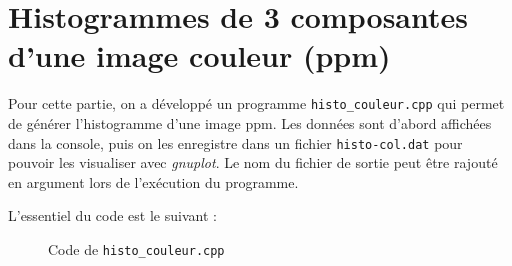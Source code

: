 \documentclass[french,a4paper,10pt]{article}
\begin{document}
	\newpage
	\section{Histogrammes de 3 composantes d'une image couleur (ppm)}\label{sec:6}


	Pour cette partie, on a d\'evelopp\'e un programme \texttt{histo\_couleur.cpp} qui permet de g\'en\'erer
	l'histogramme d'une image ppm.
	Les données sont d'abord affichées dans la console, puis on les enregistre dans un fichier \texttt{histo-col.dat}
	pour pouvoir les visualiser avec \emph{gnuplot}.
	Le nom du fichier de sortie peut être rajouté en argument lors de l'exécution du programme.

	L'essentiel du code est le suivant : %
	\begin{figure}[!htb]
		\centering
		\caption{Code de \texttt{histo\_couleur.cpp}}\label{Fig:histo-couleur-code}
	\end{figure}
\end{document}
